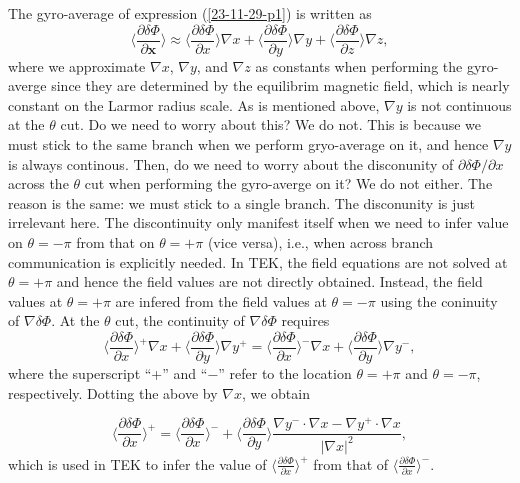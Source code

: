\documentclass{llncs}
\begin{document}
The gyro-average of expression (\ref{23-11-29-p1}) is written as
\begin{equation}
  \langle \frac{\partial \delta \Phi}{\partial \mathbf{x}} \rangle \approx
  \langle \frac{\partial \delta \Phi}{\partial x} \rangle \nabla x + \langle
  \frac{\partial \delta \Phi}{\partial y} \rangle \nabla y + \langle
  \frac{\partial \delta \Phi}{\partial z} \rangle \nabla z,
\end{equation}
where we approximate $\nabla x$, $\nabla y$, and $\nabla z$ as constants when
performing the gyro-averge since they are determined by the equilibrim
magnetic field, which is nearly constant on the Larmor radius scale. As is
mentioned above, $\nabla y$ is not continuous at the $\theta$ cut. Do we need
to worry about this? We do not. This is because we must stick to the same
branch when we perform gryo-average on it, and hence $\nabla y$ is always
continous. Then, do we need to worry about the disconunity of $\partial \delta
\Phi / \partial x$ across the $\theta$ cut when performing the gyro-averge on
it? We do not either. The reason is the same: we must stick to a single
branch. The disconunity is just irrelevant here. The discontinuity only
manifest itself when we need to infer value on $\theta = - \pi$ from that on
$\theta = + \pi$ (vice versa), i.e., when across branch communication is
explicitly needed. In TEK, the field equations are not solved at $\theta = +
\pi$ and hence the field values are not directly obtained. Instead, the field
values at $\theta = + \pi$ are infered from the field values at $\theta = -
\pi$ using the coninuity of $\nabla \delta \Phi$. At the $\theta$ cut, the
continuity of $\nabla \delta \Phi$ requires
\begin{equation}
  \langle \frac{\partial \delta \Phi}{\partial x} \rangle^+ \nabla x + \langle
  \frac{\partial \delta \Phi}{\partial y} \rangle \nabla y^+ = \langle
  \frac{\partial \delta \Phi}{\partial x} \rangle^- \nabla x + \langle
  \frac{\partial \delta \Phi}{\partial y} \rangle \nabla y^-,
\end{equation}
where the superscript ``+'' and ``$-$'' refer to the location $\theta = + \pi$
and $\theta = - \pi$, respectively. Dotting the above by $\nabla x$, we obtain


\begin{equation}
  \langle \frac{\partial \delta \Phi}{\partial x} \rangle^+ = \langle
  \frac{\partial \delta \Phi}{\partial x} \rangle^- + \langle \frac{\partial
  \delta \Phi}{\partial y} \rangle \frac{\nabla y^- \cdot \nabla x - \nabla
  y^+ \cdot \nabla x}{| \nabla x |^2},
\end{equation}
which is used in TEK to infer the value of $\langle \frac{\partial \delta
\Phi}{\partial x} \rangle^+$ from that of $\langle \frac{\partial \delta
\Phi}{\partial x} \rangle^-$.
\end{document}
